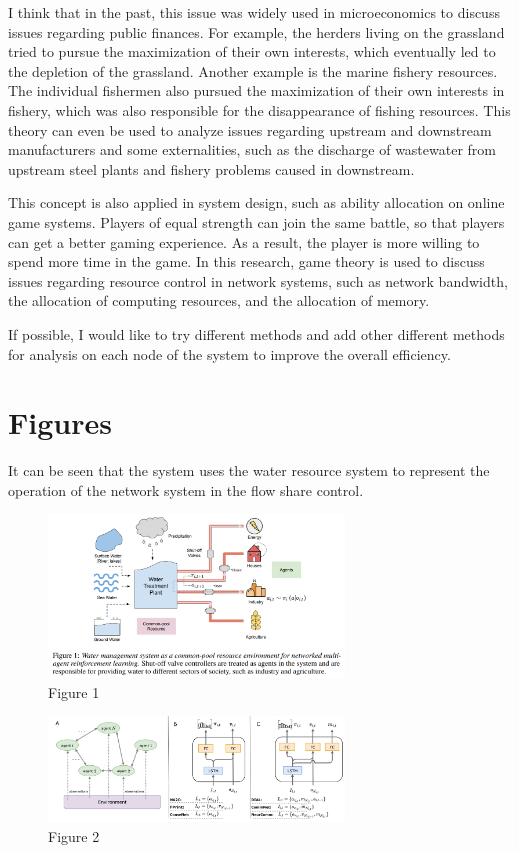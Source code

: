 \documentclass{report} %
\begin{document}
I think that in the past, this issue was widely used in microeconomics to discuss issues regarding public finances. For example, the herders living on the grassland tried to pursue the maximization of their own interests, which eventually led to the depletion of the grassland. Another example is the marine fishery resources. The individual fishermen also pursued the maximization of their own interests in fishery, which was also responsible for the disappearance of fishing resources. This theory can even be used to analyze issues regarding upstream and downstream manufacturers and some externalities, such as the discharge of wastewater from upstream steel plants and fishery problems caused in downstream.

This concept is also applied in system design, such as ability allocation on online game systems. Players of equal strength can join the same battle, so that players can get a better gaming experience. As a result, the player is more willing to spend more time in the game. In this research, game theory is used to discuss issues regarding resource control in network systems, such as network bandwidth, the allocation of computing resources, and the allocation of memory.

If possible, I would like to try different methods and add other different methods for analysis on each node of the system to improve the overall efficiency.

\section{Figures}

It can be seen that the system uses the water resource system to represent the operation of the network system in the flow share control.
\begin{figure}[H]
\centering 
\includegraphics[width=0.7\textwidth]{re-ai-1.png} 
\caption{Figure 1}
\label{Report.1}
\end{figure}
\begin{figure}[H]
\centering 
\includegraphics[width=0.7\textwidth]{re-ai-2.png} 
\caption{Figure 2}
\label{Report.2}
\end{figure}
\end{document}
